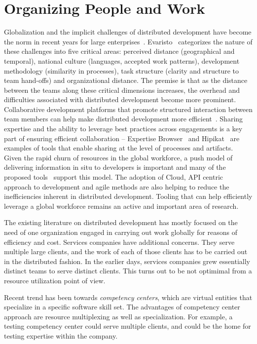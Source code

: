 \section{Organizing People and Work}
\label{sec:global}

Globalization and the implicit challenges of distributed development have
become the norm in recent years for large enterprises~\cite{glo24,glo26}.
Evaristo~\cite{glo27} categorizes the nature of these challenges into five
critical areas: perceived distance (geographical and temporal), national
culture (languages, accepted work patterns), development methodology
(similarity in processes), task structure (clarity and structure to team
hand-offs) and organizational distance. The premise is that as the distance
between the teams along these critical dimensions increases, the overhead and
difficulties associated with distributed development become more
prominent. Collaborative development platforms that promote structured
interaction between team members can help make distributed development more
efficient~\cite{glo28,glo29}. Sharing expertise and the ability to leverage
best practices across engagements is a key part of ensuring efficient
collaboration -- Expertise Browser~\cite{glo30} and Hipikat~\cite{glo31} are
examples of tools that enable sharing at the level of processes and
artifacts. Given the rapid churn of resources in the global workforce, a push
model of delivering information in situ to developers is important and many of
the proposed tools~\cite{glo29,glo31} support this model. The adoption of
Cloud, API centric approach to development and agile methods are also helping
to reduce the inefficiencies inherent in distributed development. Tooling that
can help efficiently leverage a global workforce remains an active and
important area of research.

The existing literature on distributed development has mostly focused on the
need of one organization engaged in carrying out work globally for reasons
of efficiency and cost.  Services companies have additional concerns.  They
serve multiple large clients, and the work of each of those clients has to
be carried out in the distributed fashion.  In the earlier days, services
companies grew essentially distinct teams to serve distinct clients.  This
turns out to be not optimimal from a resource utilization point of view.

Recent trend has been towards \textit{competency centers}, which are virtual
entities that specialize in a specific software skill set.  The advantages of
competency center approach are resource multiplexing as well as specialization.
For example, a testing competency center could serve multiple clients, and
could be the home for testing expertise within the company. 


